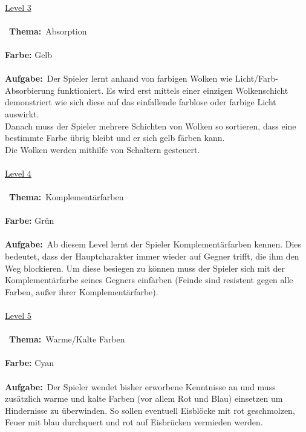 \documentclass[10pt,a4paper,notitlepage]{report}
\begin{document}
	\clearpage\
	\marginpar{\vspace{3.0mm} \color{orange}\rule{0.8mm}{53.3mm} \\[3mm] \color{hellorange}\rule{0.8mm}{170mm}}
	\\
	\underline{Level 3}\\\\\
	\textbf{Thema:}\
	Absorption
	\\\\
	\textbf{Farbe:} Gelb\
	\\\\
	\textbf{Aufgabe:}\
	Der Spieler lernt anhand von farbigen Wolken wie Licht/Farb-Absorbierung funktioniert.
	Es wird erst mittels einer einzigen Wolkenschicht demonstriert wie sich diese auf das einfallende farblose oder farbige Licht auswirkt.\\
	Danach muss der Spieler mehrere Schichten von Wolken so sortieren, dass eine bestimmte Farbe übrig bleibt und er sich gelb färben kann.\\
	Die Wolken werden mithilfe von Schaltern gesteuert.\\
	\\
	\underline{Level 4}\\\\\
	\textbf{Thema:}\
	Komplementärfarben
	\\\\
	\textbf{Farbe:} Grün\
	\\\\
	\textbf{Aufgabe:}\
	Ab diesem Level lernt der Spieler Komplementärfarben kennen. Dies bedeutet, dass der Hauptcharakter immer wieder auf Gegner trifft, die ihm den Weg blockieren. Um diese besiegen zu können muss der Spieler sich mit der Komplementärfarbe seines Gegners einfärben (Feinde sind resistent gegen alle Farben, außer ihrer Komplementärfarbe). 
	\\\\
	\underline{Level 5}\\\\\
	\textbf{Thema:}\
	Warme/Kalte Farben
	\\\\
	\textbf{Farbe:} Cyan\
	\\\\
	\textbf{Aufgabe:}\
	Der Spieler wendet bisher erworbene Kenntnisse an und muss zusätzlich warme und kalte Farben (vor allem Rot und Blau) einsetzen um Hindernisse zu 			überwinden. So sollen eventuell Eisblöcke mit rot geschmolzen, Feuer mit blau durchquert und rot auf Eisbrücken vermieden werden.
\end{document}
